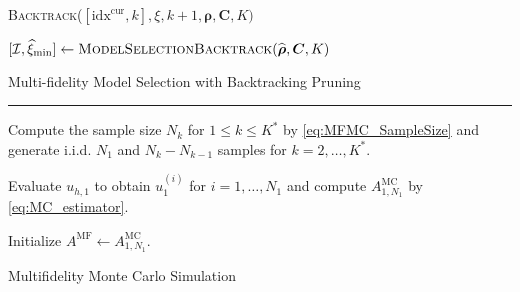 \begin{algorithm}[!ht]
{{    \textsc{Backtrack}($[\text{idx}^{\text{cur}}, k], \xi, k+1,\boldsymbol{\rho}, \boldsymbol{C},K)$ \;
  }
}

\vspace{3mm} 
$[\mathcal{I},  \widehat{\xi}_{\min}] \gets \textsc{ModelSelectionBacktrack}(\widehat{\boldsymbol{\rho}}, \boldsymbol{C},K)$ \;

\caption{Multi-fidelity Model Selection with Backtracking Pruning}
\end{algorithm}
\ULforem





\normalem
\begin{algorithm}[!ht]
\label{algo:MFMC_Algo}
\DontPrintSemicolon

    
   \vspace{1ex}
    
    \vspace{1ex}
    \hrule \vspace{1ex}
    

    Compute the sample size $N_k$ for $1\leq k\leq K^*$ by \eqref{eq:MFMC_SampleSize} and generate i.i.d. $N_1$ and $N_k-N_{k-1}$ samples for $k=2,\ldots, K^*$.

    Evaluate $u_{h, 1}$ to obtain $u_1^{(i)}$ for $i = 1,\ldots,N_1$ and compute $A_{1,N_1}^{\text{MC}}$ by \eqref{eq:MC_estimator}.

    Initialize $A^{\text{MF}} \gets A_{1,N_1}^{\text{MC}}$.
    

    
\caption{Multifidelity Monte Carlo Simulation}
\end{algorithm}
\ULforem

